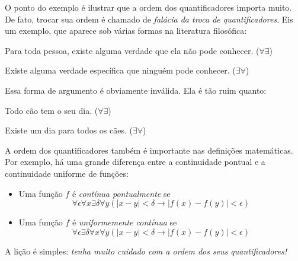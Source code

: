 O ponto do exemplo é ilustrar que a ordem dos quantificadores importa muito. De fato, trocar sua ordem é chamado de \emph{falácia da troca de quantificadores}. Eis um exemplo, que aparece sob várias formas na literatura filosófica:
	\begin{earg}
\item[] Para toda pessoa, existe alguma verdade que ela não pode conhecer. \hfill ($\forall \exists$)
\item[\texttherefore] Existe alguma verdade específica que ninguém pode conhecer. \hfill ($\exists \forall$)
	\end{earg}
Essa forma de argumento é obviamente inválida. Ela é tão ruim quanto:
	\begin{earg}
\item[] Todo cão tem o seu dia. \hfill ($\forall \exists$)
\item[\texttherefore] Existe um dia para todos os cães. \hfill ($\exists \forall$)
	\end{earg}

A ordem dos quantificadores também é importante nas definições matemáticas. Por exemplo, há uma grande diferença entre a continuidade pontual e a continuidade uniforme de funções:
\begin{itemize}
\item Uma função $f$ é \emph{contínua pontualmente} se
\[
\forall \epsilon\forall x\exists \delta\forall y(\left|x - y\right| < \delta \to \left|f(x) - f(y)\right| < \epsilon)
\]
\item Uma função $f$ é \emph{uniformemente contínua} se
\[
\forall \epsilon\exists \delta\forall x\forall y(\left|x - y\right| < \delta \to \left|f(x) - f(y)\right| < \epsilon)
\]
\end{itemize}

A lição é simples: \emph{tenha muito cuidado com a ordem dos seus quantificadores!}


